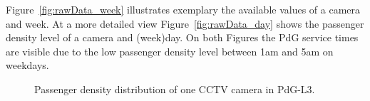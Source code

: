 Figure~\ref{fig:rawData_week} illustrates exemplary the available values of a camera and week. At a more detailed view Figure~\ref{fig:rawData_day} shows the passenger density level of a camera and (week)day. On both Figures the PdG service times are visible due to the low passenger density level between 1am and 5am on weekdays.

\begin{figure}[htb]

  \centering

  \hfill

  \caption{Passenger density distribution of one CCTV camera in PdG-L3.}
  \label{fig:rawData}

\end{figure}


